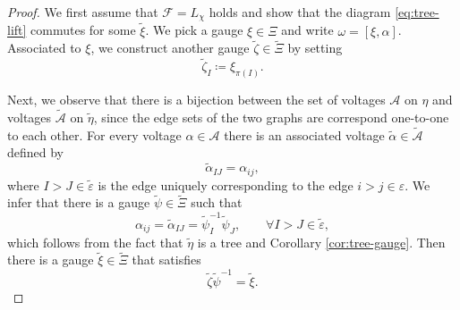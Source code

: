 \documentclass[10pt,reqno]{amsart}
\numberwithin{equation}{section}
\theoremstyle{bfnote}
\theoremstyle{bfdef}
\newcommand{\mc}[1]{\mathcal{#1}}
\newcommand{\veps}{\varepsilon}
\providecommand\a; %
\renewcommand{\a}{\alpha}
\begin{document}
	\begin{proof}

		We first assume that $\mc{F} = L_{\chi}$ holds and show that the diagram \eqref{eq:tree-lift} commutes for some $\tilde \xi$. We pick a gauge $\xi \in \Xi$ and write $\omega = [\xi,\a]$. Associated to $\xi$, we construct another gauge $\tilde\zeta\in\tilde\Xi$ by setting
		\begin{equation}\label{eq:proof-zeta-sigma-xi}
			\tilde\zeta_{I} \coloneqq \xi_{\pi(I)}.
		\end{equation}

		Next, we observe that there is a bijection between the set of voltages $\mc A$ on $\eta$ and voltages $\tilde{\mc A}$ on $\tilde \eta$, since the edge sets of the two graphs are correspond one-to-one to each other. For every voltage $\alpha \in \mc{A}$ there is an associated voltage $\tilde \alpha \in \tilde{\mc A}$ defined by
		\begin{equation}
			\tilde \alpha_{IJ} = \alpha_{ij},
		\end{equation} 
		where $I>J \in \tilde \veps$ is the edge uniquely corresponding to the edge $i>j \in \veps$. We infer that there is a gauge $\tilde{\psi} \in \tilde\Xi$ such that
		\begin{equation}\label{eq:proof-sync}
			\alpha_{ij} = \tilde \alpha_{IJ} = \tilde \psi_{I}^{-1} \tilde \psi_{J}, \qquad \forall I>J \in \tilde \veps,
		\end{equation}
		which follows from the fact that $\tilde\eta$ is a tree and Corollary \ref{cor:tree-gauge}.
		Then there is a gauge $\tilde\xi \in \tilde\Xi$ that satisfies
		\begin{equation}\label{eq:proof-blow-up-gauge-transform}
			\tilde\zeta\tilde\psi^{-1}=\tilde\xi.
		\end{equation}


\end{proof}
\end{document}
